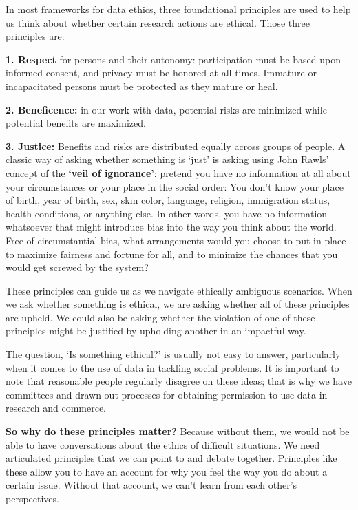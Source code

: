 \documentclass[]{book}
\begin{document}
In most frameworks for data ethics, three foundational principles are used to help us think about whether certain research actions are ethical. Those three principles are:

\textbf{1. Respect} for persons and their autonomy: participation must be based upon informed consent, and privacy must be honored at all times. Immature or incapacitated persons must be protected as they mature or heal.

\textbf{2. Beneficence:} in our work with data, potential risks are minimized while potential benefits are maximized.

\textbf{3. Justice:} Benefits and risks are distributed equally across groups of people. A classic way of asking whether something is `just' is asking using John Rawls' concept of the \textbf{`veil of ignorance'}: pretend you have no information at all about your circumstances or your place in the social order: You don't know your place of birth, year of birth, sex, skin color, language, religion, immigration status, health conditions, or anything else. In other words, you have no information whatsoever that might introduce bias into the way you think about the world. Free of circumstantial bias, what arrangements would you choose to put in place to maximize fairness and fortune for all, and to minimize the chances that you would get screwed by the system?

These principles can guide us as we navigate ethically ambiguous scenarios. When we ask whether something is ethical, we are asking whether all of these principles are upheld. We could also be asking whether the violation of one of these principles might be justified by upholding another in an impactful way.

The question, `Is something ethical?' is usually not easy to answer, particularly when it comes to the use of data in tackling social problems. It is important to note that reasonable people regularly disagree on these ideas; that is why we have committees and drawn-out processes for obtaining permission to use data in research and commerce.

\textbf{So why do these principles matter?} Because without them, we would not be able to have conversations about the ethics of difficult situations. We need articulated principles that we can point to and debate together. Principles like these allow you to have an account for why you feel the way you do about a certain issue. Without that account, we can't learn from each other's perspectives.
\end{document}
